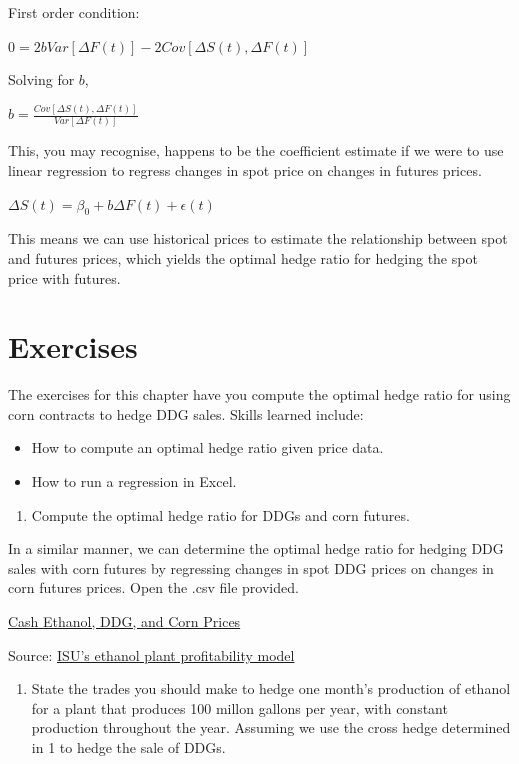 \documentclass[
]{book}
\providecommand{\tightlist}{%
  \setlength{\itemsep}{0pt}\setlength{\parskip}{0pt}}
\begin{document}
First order condition:

\(0 = 2bVar[\Delta F(t)] - 2Cov[\Delta S(t),\Delta F(t)]\)

Solving for \(b\),

\(b = \frac{Cov[\Delta S(t),\Delta F(t)]}{Var[\Delta F(t)]}\)

This, you may recognise, happens to be the coefficient estimate if we were to use linear regression to regress changes in spot price on changes in futures prices.

\(\Delta S(t) = \beta_0 + b\Delta F(t) + \epsilon(t)\)

This means we can use historical prices to estimate the relationship between spot and futures prices, which yields the optimal hedge ratio for hedging the spot price with futures.

\hypertarget{exercises-8}{%
\section{Exercises}\label{exercises-8}}

The exercises for this chapter have you compute the optimal hedge ratio for using corn contracts to hedge DDG sales. Skills learned include:

\begin{itemize}
\item
  How to compute an optimal hedge ratio given price data.
\item
  How to run a regression in Excel.
\end{itemize}

\begin{enumerate}
\def\labelenumi{\arabic{enumi}.}
\tightlist
\item
  Compute the optimal hedge ratio for DDGs and corn futures.
\end{enumerate}

In a similar manner, we can determine the optimal hedge ratio for hedging DDG sales with corn futures by regressing changes in spot DDG prices on changes in corn futures prices. Open the .csv file provided.

\href{http://mindymallory.github.io/PriceAnalysis/Excel-files/Ethanol-Prices.csv}{Cash Ethanol, DDG, and Corn Prices}

Source: \href{https://www.extension.iastate.edu/agdm/articles/hof/HofJan08.html}{ISU's ethanol plant profitability model}

\begin{enumerate}
\def\labelenumi{\arabic{enumi}.}
\setcounter{enumi}{1}
\tightlist
\item
  State the trades you should make to hedge one month's production of ethanol for a plant that produces 100 millon gallons per year, with constant production throughout the year. Assuming we use the cross hedge determined in 1 to hedge the sale of DDGs.
\end{enumerate}
\end{document}
